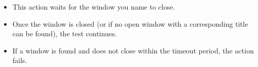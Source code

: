 \begin{itemize}
\item This action waits for the window you name to close.
\item Once the window is closed (or if no open window with a corresponding title can be found), the test continues.
\item If a window is found and does not close within the timeout period, the action fails.
\end{itemize}

